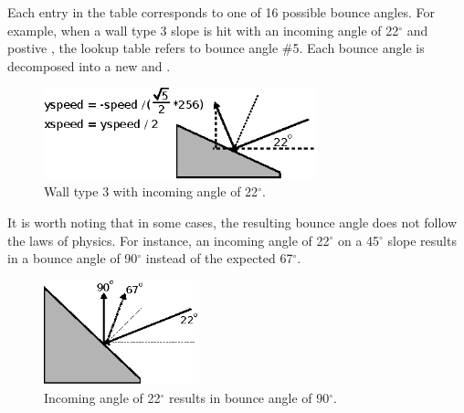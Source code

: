 \documentclass[book.tex]{subfiles}
\begin{document}
\par
Each entry in the table corresponds to one of 16 possible bounce angles. For example, when a wall type 3 slope is hit with an incoming angle of 22$^{\circ}$ and postive , the lookup table refers to bounce angle \#5. Each bounce angle is decomposed into a new  and .\\


\par
\begin{figure}[H]
\centering
\includegraphics[width=0.7\textwidth]{imgs/drawings/bounce_angle.eps}
\caption{Wall type 3 with incoming angle of 22$^{\circ}$.}
\label{fig:bounce_angles}
\end{figure}
\par

\begin{minipage}{\textwidth}
  
\end{minipage}

\bigskip
\par
It is worth noting that in some cases, the resulting bounce angle does not follow the laws of physics. For instance, an incoming angle of 22$^{\circ}$ on a 45$^{\circ}$ slope results in a bounce angle of 90$^{\circ}$ instead of the expected 67$^{\circ}$.\\

\par
\begin{figure}[H]
\centering
\includegraphics[width=0.4\textwidth]{imgs/drawings/bounce_physics.eps}
\caption{Incoming angle of 22$^{\circ}$ results in bounce angle of 90$^{\circ}$.}
\end{figure}
\par
\end{document}
